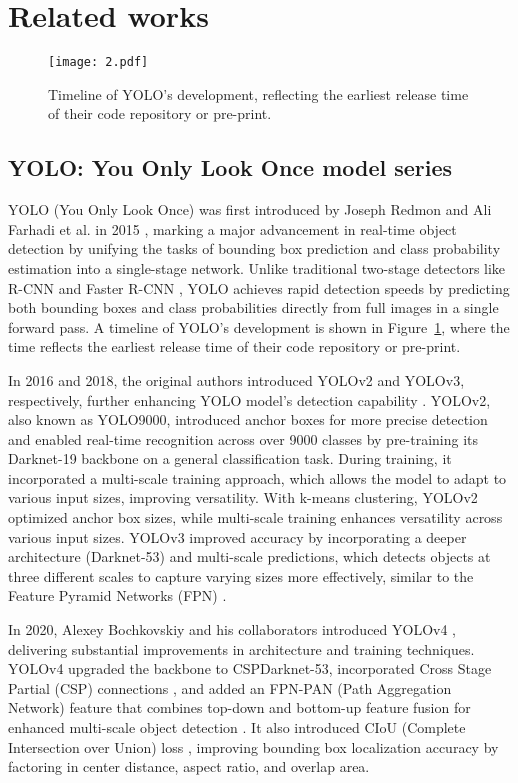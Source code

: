 \section{Related works}
\begin{figure}[H]
\centering
\texttt{[image: 2.pdf]} %
\caption{Timeline of YOLO's development, reflecting the earliest release time of their code repository or pre-print.}
\label{fig:timeline}
\end{figure}

\subsection{YOLO: You Only Look Once model series }
YOLO (You Only Look Once) was first introduced by Joseph Redmon and Ali Farhadi et al. in 2015 \cite{Redmon2016}, marking a major advancement in real-time object detection by unifying the tasks of bounding box prediction and class probability estimation into a single-stage network. Unlike traditional two-stage detectors like R-CNN and Faster R-CNN \cite{Girshick2014, Ren2016}, YOLO achieves rapid detection speeds by predicting both bounding boxes and class probabilities directly from full images in a single forward pass. A timeline of YOLO's development is shown in Figure~\ref{fig:timeline}, where the time reflects the earliest release time of their code repository or pre-print.

In 2016 and 2018, the original authors introduced YOLOv2 and YOLOv3, respectively, further enhancing YOLO model’s detection capability \cite{Redmon2017, Redmon2018}. YOLOv2, also known as YOLO9000, introduced anchor boxes for more precise detection and enabled real-time recognition across over 9000 classes by pre-training its Darknet-19 backbone on a general classification task. During training, it incorporated a multi-scale training approach, which allows the model to adapt to various input sizes, improving versatility. With k-means clustering, YOLOv2 optimized anchor box sizes, while multi-scale training enhances versatility across various input sizes. YOLOv3 improved accuracy by incorporating a deeper architecture (Darknet-53) and multi-scale predictions, which detects objects at three different scales to capture varying sizes more effectively, similar to the Feature Pyramid Networks (FPN) \cite{Lin2017}.

In 2020, Alexey Bochkovskiy and his collaborators introduced YOLOv4 \cite{Bochkovskiy2020}, delivering substantial improvements in architecture and training techniques. YOLOv4 upgraded the backbone to CSPDarknet-53, incorporated Cross Stage Partial (CSP) connections \cite{Wang2020b}, and added an FPN-PAN (Path Aggregation Network) feature that combines top-down and bottom-up feature fusion for enhanced multi-scale object detection \cite{Liu2018}. It also introduced CIoU (Complete Intersection over Union) loss \cite{Zheng2020}, improving bounding box localization accuracy by factoring in center distance, aspect ratio, and overlap area.

